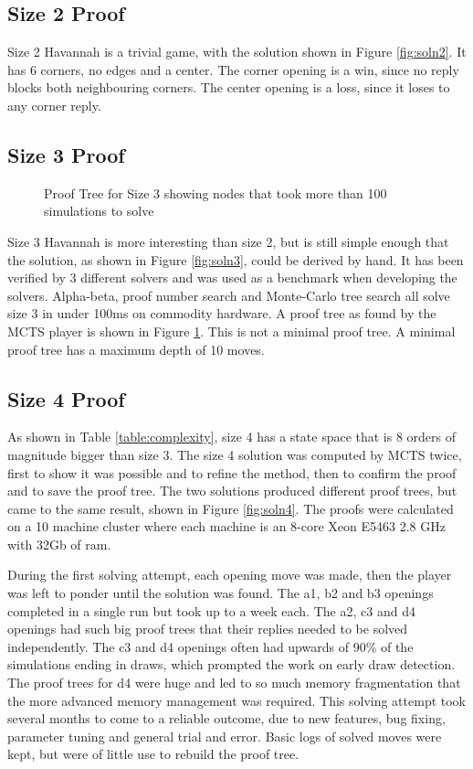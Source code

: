 \subsection{Size 2 Proof}

Size 2 Havannah is a trivial game, with the solution shown in Figure \ref{fig:soln2}. It has 6 corners, no edges and a center. The corner opening is a win, since no reply blocks both neighbouring corners. The center opening is a loss, since it loses to any corner reply.

\subsection{Size 3 Proof}

\begin{figure}
\centering

\caption[Proof Tree for Size 3]{Proof Tree for Size 3 showing nodes that took more than 100 simulations to solve}
\label{fig:proof3}
\end{figure}

Size 3 Havannah is more interesting than size 2, but is still simple enough that the solution, as shown in Figure \ref{fig:soln3}, could be derived by hand. It has been verified by 3 different solvers and was used as a benchmark when developing the solvers. Alpha-beta, proof number search and Monte-Carlo tree search all solve size 3 in under 100ms on commodity hardware. A proof tree as found by the MCTS player is shown in Figure \ref{fig:proof3}. This is not a minimal proof tree. A minimal proof tree has a maximum depth of 10 moves.


\subsection{Size 4 Proof}\label{sec:size4proof}

As shown in Table \ref{table:complexity}, size 4  has a state space that is 8 orders of magnitude bigger than size 3. The size 4 solution was computed by MCTS twice, first to show it was possible and to refine the method, then to confirm the proof and to save the proof tree. The two solutions produced different proof trees, but came to the same result, shown in Figure \ref{fig:soln4}. The proofs were calculated on a 10 machine cluster where each machine is an 8-core Xeon E5463 2.8 GHz with 32Gb of ram.

During the first solving attempt, each opening move was made, then the player was left to ponder until the solution was found. The a1, b2 and b3 openings completed in a single run but took up to a week each. The a2, c3 and d4 openings had such big proof trees that their replies needed to be solved independently. The c3 and d4 openings often had upwards of 90\% of the simulations ending in draws, which prompted the work on early draw detection. The proof trees for d4 were huge and led to so much memory fragmentation that the more advanced memory management was required. This solving attempt took several months to come to a reliable outcome, due to new features, bug fixing, parameter tuning and general trial and error. Basic logs of solved moves were kept, but were of little use to rebuild the proof tree.

